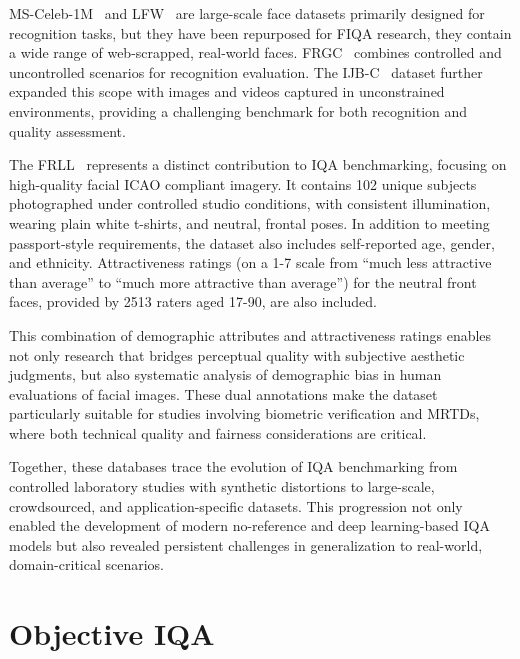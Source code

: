 \acf{MS-Celeb-1M}~\cite{msceleb1m} and \acf{LFW}~\cite{lfw} are large-scale face datasets primarily designed for recognition tasks, but they have been repurposed for \acs{FIQA} research, they contain a wide range of web-scrapped, real-world faces. \acf{FRGC}~\cite{frgc} combines controlled and uncontrolled scenarios for recognition evaluation. The \acf{IJB-C}~\cite{ijbc} dataset further expanded this scope with images and videos captured in unconstrained environments, providing a challenging benchmark for both recognition and quality assessment.

The \acf{FRLL}~\cite{frll} represents a distinct contribution to \acs{IQA} benchmarking, focusing on high-quality facial \acs{ICAO} compliant imagery. It contains 102 unique subjects photographed under controlled studio conditions, with consistent illumination, wearing plain white t-shirts, and neutral, frontal poses. In addition to meeting passport-style requirements, the dataset also includes self-reported age, gender, and ethnicity. Attractiveness ratings (on a 1-7 scale from ``much less attractive than average'' to ``much more attractive than average'') for the neutral front faces, provided by 2513 raters aged 17-90, are also included.

This combination of demographic attributes and attractiveness ratings enables not only research that bridges perceptual quality with subjective aesthetic judgments, but also systematic analysis of demographic bias in human evaluations of facial images. These dual annotations make the dataset particularly suitable for studies involving biometric verification and \acs{MRTDs}, where both technical quality and fairness considerations are critical.

Together, these databases trace the evolution of \acs{IQA} benchmarking from controlled laboratory studies with synthetic distortions to large-scale, crowdsourced, and application-specific datasets. This progression not only enabled the development of modern no-reference and deep learning-based \acs{IQA} models but also revealed persistent challenges in generalization to real-world, domain-critical scenarios.

\section{Objective \acl{IQA}}\label{sec:objective_iqa}

